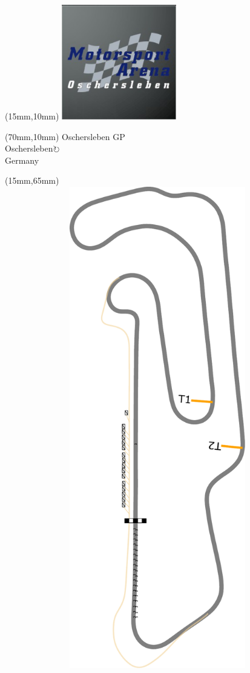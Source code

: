 \null\newpage
\begin{textblock*}{50mm}(15mm,10mm)%
\includegraphics[width=50mm]{LG/2015-05-20_00090.png}
\end{textblock*}
\begin{textblock*}{130mm}(70mm,10mm)%
{\fontsize{20}{20}\selectfont Oschersleben GP\\}
{\fontsize{16}{16}\selectfont Oschersleben\hfill \Large$\circlearrowright$\\}
{\fontsize{12}{12}\selectfont Germany\\}
\end{textblock*}
\begin{textblock*}{185mm}(15mm,65mm)%
\centering
\mbox{\includegraphics[width=185mm,height=210mm,keepaspectratio]{PT/OSGP.pdf}}
\end{textblock*}
